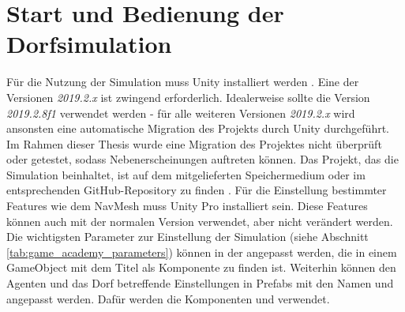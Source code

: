 \section{Start und Bedienung der Dorfsimulation}
Für die Nutzung der Simulation muss Unity installiert werden \cite{unity_download}. Eine der Versionen \textit{2019.2.x} ist zwingend erforderlich. Idealerweise sollte die Version \textit{2019.2.8f1} verwendet werden - für alle weiteren Versionen \textit{2019.2.x} wird ansonsten eine automatische Migration des Projekts durch Unity durchgeführt. Im Rahmen dieser Thesis wurde eine Migration des Projektes nicht überprüft oder getestet, sodass Nebenerscheinungen auftreten können. Das Projekt, das die Simulation beinhaltet, ist auf dem mitgelieferten Speichermedium oder im entsprechenden GitHub-Repository zu finden \cite{thesis_github_project}.
Für die Einstellung bestimmter Features wie dem NavMesh muss Unity Pro installiert sein. Diese Features können auch mit der normalen Version verwendet, aber nicht verändert werden.
Die wichtigsten Parameter zur Einstellung der Simulation (siehe Abschnitt \ref{tab:game_academy_parameters}) können in der  angepasst werden, die in einem GameObject mit dem Titel  als Komponente zu finden ist. Weiterhin können den Agenten und das Dorf betreffende Einstellungen in Prefabs mit den Namen  und  angepasst werden. Dafür werden die Komponenten  und  verwendet.


